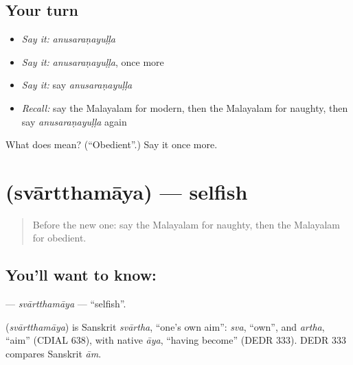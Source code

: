 \subsection*{Your turn}
\begin{itemize}
\raggedright
  \item \emph{Say it:} \emph{anusaraṇayuḷḷa}
  \item \emph{Say it:} \emph{anusaraṇayuḷḷa}, once more
  \item \emph{Say it:} say \emph{anusaraṇayuḷḷa}
  \item \emph{Recall:} say the Malayalam for modern, then the Malayalam for naughty, then say \emph{anusaraṇayuḷḷa} again
\end{itemize}

\begin{tcolorbox}[breakable,colback=teal!4,colframe=teal!35!black,title={Before you move on}]
What does  mean? (\textquotedblleft{}Obedient\textquotedblright{}.) Say it once more.
\end{tcolorbox}
\section[\texorpdfstring{\ml{സ്വാർത്ഥമായ} (svārtthamāya)}{സ്വാർത്ഥമായ (svārtthamāya)}]{ (svārtthamāya) — selfish}

\label{lesson:ML-C206-svartthamaya}



\begin{quote}
Before the new one: say the Malayalam for naughty, then the Malayalam for obedient.
\end{quote}

\subsection*{You'll want to know: }
\textbf{} — \emph{svārtthamāya} — \textquotedblleft{}selfish\textquotedblright{}.

\begin{cousinweb}
\textbf{} (\emph{svārtthamāya}) is Sanskrit \emph{svārtha}, \textquotedblleft{}one's own aim\textquotedblright{}: \emph{sva}, \textquotedblleft{}own\textquotedblright{}, and \emph{artha}, \textquotedblleft{}aim\textquotedblright{} (CDIAL 638), with native \emph{āya}, \textquotedblleft{}having become\textquotedblright{} (DEDR 333). DEDR 333 compares Sanskrit \emph{ām}.
\end{cousinweb}


